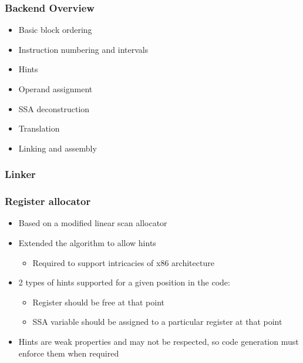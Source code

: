 \begin{frame}
\frametitle{\bf Backend Overview}

\begin{itemize}
    \item Basic block ordering
    \item Instruction numbering and intervals
    \item Hints
    \item Operand assignment
    \item SSA deconstruction
    \item Translation
    \item Linking and assembly
\end{itemize}

\end{frame}

\begin{frame}
\frametitle{\bf Linker}

\end{frame}

\begin{frame}
\frametitle{\bf Register allocator}

\begin{itemize}
    \item Based on a modified linear scan allocator
    \item Extended the algorithm to allow hints
    \begin{itemize}
        \item Required to support intricacies of x86 architecture
    \end{itemize}
    \item 2 types of hints supported for a given position in the code:
    \begin{itemize}
        \item Register should be free at that point
        \item SSA variable should be assigned to a particular register at that point
    \end{itemize}
    \item Hints are weak properties and may not be respected, so code generation must enforce
    them when required
\end{itemize}
\end{frame}

